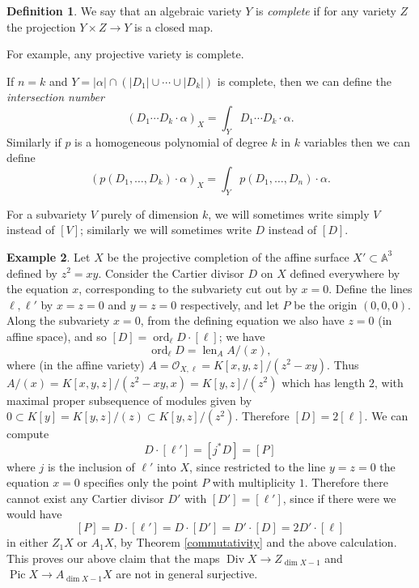 \documentclass[12pt]{article}
\theoremstyle{definition}
\newtheorem{defn}{Definition}[section]
\newtheorem{ex}[defn]{Example}
\theoremstyle{theorem}
\renewcommand{\O}{\mathcal O}
\newcommand{\1}{\mathbbm 1}
\newcommand{\A}{\mathbb A}
\DeclareMathOperator{\Div}{Div}
\DeclareMathOperator{\Pic}{Pic}
\DeclareMathOperator{\ord}{ord}
\DeclareMathOperator{\len}{len}
\begin{document}
\begin{defn}
We say that an algebraic variety $Y$ is {\em complete} if for any variety $Z$ the projection $Y \times Z \to Y$ is a closed map.
\end{defn}
For example, any projective variety is complete.

If $n = k$ and $Y = |\alpha| \cap (|D_1| \cup \cdots \cup |D_k|)$ is complete, then we can define the {\em intersection number} \[ (D_1 \cdots D_k \cdot \alpha)_X = \int_Y D_1 \cdots D_k \cdot \alpha . \] Similarly if $p$ is a homogeneous polynomial of degree $k$ in $k$ variables then we can define \[ (p(D_1, \ldots, D_k) \cdot \alpha)_X = \int_Y p(D_1, \ldots, D_n) \cdot \alpha . \]

For a subvariety $V$ purely of dimension $k$, we will sometimes write simply $V$ instead of $[V]$; similarly we will sometimes write $D$ instead of $[D]$.

\begin{ex}
Let $X$ be the projective completion of the affine surface $X' \subset \A^3$ defined by $z^2 = xy$. Consider the Cartier divisor $D$ on $X$ defined everywhere by the equation $x$, corresponding to the subvariety cut out by $x = 0$. Define the lines $\ell, \ell'$ by $x = z = 0$ and $y = z = 0$ respectively, and let $P$ be the origin $(0,0,0)$. Along the subvariety $x = 0$, from the defining equation we also have $z = 0$ (in affine space), and so $[D] = \ord_\ell D \cdot [\ell]$; we have \[ \ord_\ell D = \len_A A/(x) , \] where (in the affine variety) $A = \O_{X,\ell} = K[x,y,z]/(z^2 - x y)$. Thus $A/(x) = K[x,y,z]/(z^2-xy,x) = K[y,z]/(z^2)$ which has length $2$, with maximal proper subsequence of modules given by $0 \subset K[y] = K[y,z]/(z) \subset K[y,z]/(z^2)$. Therefore $[D] = 2 [\ell]$.  We can compute \[ D \cdot [\ell'] = [j^* D] = [P] \] where $j$ is the inclusion of $\ell'$ into $X$, since restricted to the line $y = z = 0$ the equation $x=0$ specifies only the point $P$ with multiplicity $1$. Therefore there cannot exist any Cartier divisor $D'$ with $[D'] = [\ell']$, since if there were we would have \[ [P] = D \cdot [\ell'] = D \cdot [D'] = D' \cdot [D] = 2 D' \cdot [\ell] \] in either $Z_1 X$ or $A_1 X$, by Theorem \ref{commutativity} and the above calculation. This proves our above claim that the maps $\Div X \to Z_{\dim X - 1}$ and $\Pic X \to A_{\dim X - 1} X$ are not in general surjective.
\end{ex}
\end{document}
